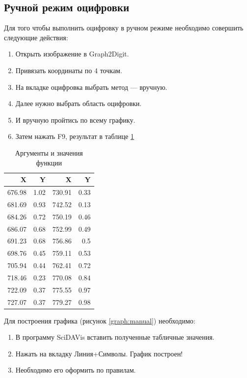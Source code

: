 \documentclass[a4paper,14pt,russian]{report}
\begin{document}
\subsection{Ручной режим оцифровки}

Для того чтобы выполнить оцифровку в ручном режиме необходимо совершить следующие действия:

\begin{enumerate}
  \item Открыть изображение в Graph2Digit.
  \item Привязать координаты по 4 точкам.
  \item На вкладке оцифровка выбрать метод — вручную.
  \item Далее нужно выбрать область оцифровки.
  \item И вручную пройтись по всему графику.
  \item Затем нажать F9, результат в таблице \ref{table:manual}
\end{enumerate}

\begin{table}[!htb]
  \centering
  \caption{Аргументы и значения функции}
  \label{table:manual}
  \begin{tabular}{|r|r|r|r|}
    \hline
    X & Y & X & Y \\
    \hline
    676.98 & 1.02 & 730.91 & 0.33 \\
    681.69 & 0.93 & 742.52 & 0.13 \\
    684.26 & 0.72 & 750.19 & 0.46 \\
    686.07 & 0.68 & 752.99 & 0.49 \\
    691.23 & 0.68 & 756.86 & 0.5  \\
    698.76 & 0.45 & 759.11 & 0.53 \\
    705.94 & 0.44 & 762.41 & 0.72 \\
    718.46 & 0.23 & 770.08 & 0.84 \\
    722.09 & 0.37 & 775.55 & 0.97 \\
    727.07 & 0.37 & 779.27 & 0.98 \\
    \hline
  \end{tabular}
\end{table}

Для построения графика (рисунок \ref{graph:manual}) необходимо:

\begin{enumerate}
  \item В программу SciDAVis вставить полученные табличные значения.
  \item Нажать на вкладку Линия+Символы. График построен!
  \item Необходимо его оформить по правилам.
\end{enumerate}
\end{document}
